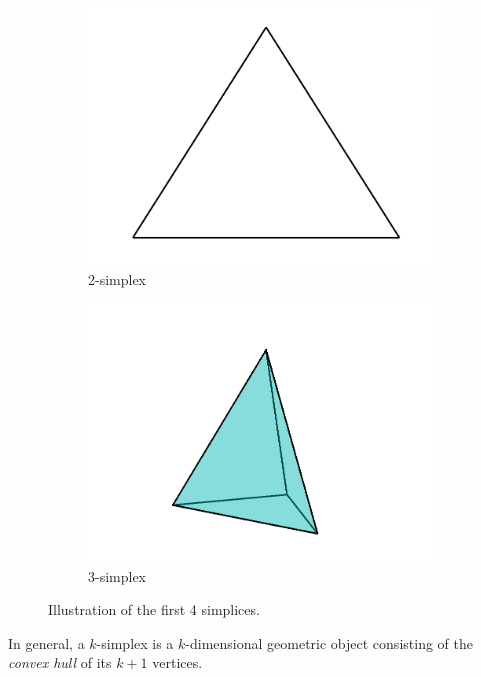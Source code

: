 \begin{figure}[ht]
\begin{subfigure}[b]{0.2\textwidth}
        \centering
        \includegraphics[width=\textwidth]{report/Images/Theory/simplices/simplices2.png}
        \caption{2-simplex}
        \label{fig:2-simplex}
    \end{subfigure}
    \hfill
    \begin{subfigure}[b]{0.2\textwidth}
        \centering
        \includegraphics[width=\textwidth]{report/Images/Theory/simplices/simplices3.png}
        \caption{3-simplex}
        \label{fig:3-simplex}
    \end{subfigure}
    \hfill
    \caption{Illustration of the first 4 simplices.}
    \label{fig:simplices}
\end{figure}

In general, a $k$-simplex is a $k$-dimensional geometric object consisting of the \emph{convex hull} of its $k + 1$ vertices.


